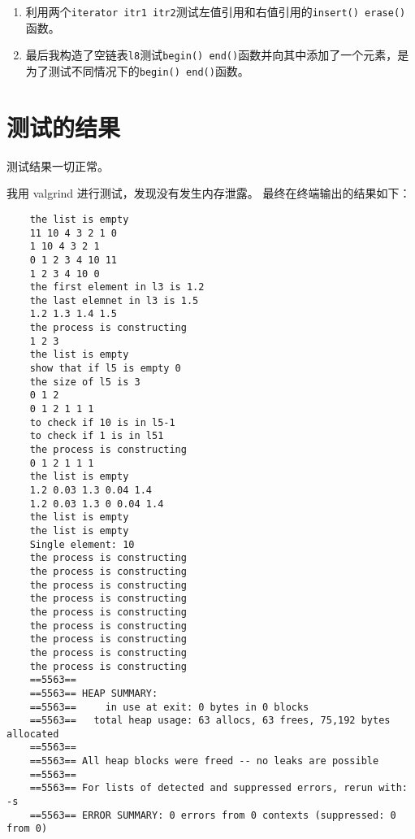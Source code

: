 \documentclass[UTF8]{ctexart}
\begin{document}
\begin{enumerate}
	\item 利用两个\lstinline|iterator itr1 itr2|测试左值引用和右值引用的\lstinline|insert() erase()|函数。
	\item 最后我构造了空链表\lstinline|l8|测试\lstinline|begin() end()|函数并向其中添加了一个元素，是为了测试不同情况下的\lstinline|begin() end()|函数。
\end{enumerate}

\section{测试的结果}

测试结果一切正常。

我用 valgrind 进行测试，发现没有发生内存泄露。
最终在终端输出的结果如下：
\begin{lstlisting}
	the list is empty
	11 10 4 3 2 1 0 
	1 10 4 3 2 1 
	0 1 2 3 4 10 11 
	1 2 3 4 10 0 
	the first element in l3 is 1.2
	the last elemnet in l3 is 1.5
	1.2 1.3 1.4 1.5 
	the process is constructing
	1 2 3 
	the list is empty
	show that if l5 is empty 0
	the size of l5 is 3
	0 1 2 
	0 1 2 1 1 1 
	to check if 10 is in l5-1
	to check if 1 is in l51
	the process is constructing
	0 1 2 1 1 1 
	the list is empty
	1.2 0.03 1.3 0.04 1.4 
	1.2 0.03 1.3 0 0.04 1.4 
	the list is empty
	the list is empty
	Single element: 10
	the process is constructing
	the process is constructing
	the process is constructing
	the process is constructing
	the process is constructing
	the process is constructing
	the process is constructing
	the process is constructing
	the process is constructing
	==5563== 
	==5563== HEAP SUMMARY:
	==5563==     in use at exit: 0 bytes in 0 blocks
	==5563==   total heap usage: 63 allocs, 63 frees, 75,192 bytes allocated
	==5563== 
	==5563== All heap blocks were freed -- no leaks are possible
	==5563== 
	==5563== For lists of detected and suppressed errors, rerun with: -s
	==5563== ERROR SUMMARY: 0 errors from 0 contexts (suppressed: 0 from 0)
\end{lstlisting}
\end{document}
